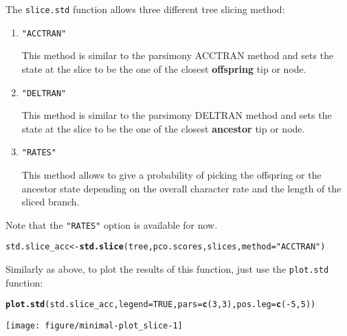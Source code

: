 \documentclass[a4paper,11pt]{article}\usepackage[]{graphicx}\usepackage[]{color}
\makeatletter
\def\maxwidth{ %
  \ifdim\Gin@nat@width>\linewidth
    \linewidth
  \else
    \Gin@nat@width
  \fi
}
\newcommand{\hlnum}[1]{\textcolor[rgb]{0.686,0.059,0.569}{#1}}%
\newcommand{\hlstr}[1]{\textcolor[rgb]{0.192,0.494,0.8}{#1}}%
\newcommand{\hlopt}[1]{\textcolor[rgb]{0,0,0}{#1}}%
\newcommand{\hlstd}[1]{\textcolor[rgb]{0.345,0.345,0.345}{#1}}%
\newcommand{\hlkwb}[1]{\textcolor[rgb]{0.69,0.353,0.396}{#1}}%
\newcommand{\hlkwc}[1]{\textcolor[rgb]{0.333,0.667,0.333}{#1}}%
\newcommand{\hlkwd}[1]{\textcolor[rgb]{0.737,0.353,0.396}{\textbf{#1}}}%
\newenvironment{kframe}{%
 \def\at@end@of@kframe{}%
 \ifinner\ifhmode%
  \def\at@end@of@kframe{\end{minipage}}%
  \begin{minipage}{\columnwidth}%
 \fi\fi%
 \def\FrameCommand##1{\hskip\@totalleftmargin \hskip-\fboxsep
 \colorbox{shadecolor}{##1}\hskip-\fboxsep
     \hskip-\linewidth \hskip-\@totalleftmargin \hskip\columnwidth}%
 \MakeFramed {\advance\hsize-\width
   \@totalleftmargin\z@ \linewidth\hsize
   \@setminipage}}%
 {\par\unskip\endMakeFramed%
 \at@end@of@kframe}
\newenvironment{knitrout}{}{} %
\makeatother
\begin{document}
The \texttt{slice.std} function allows three different tree slicing method:
\begin{enumerate}
\item{\texttt{"ACCTRAN"}}

This method is similar to the parsimony ACCTRAN method and sets the state at the slice to be the one of the closest \textbf{offspring} tip or node.
\item{\texttt{"DELTRAN"}}

This method is similar to the parsimony DELTRAN method and sets the state at the slice to be the one of the closest \textbf{ancestor} tip or node.
\item{\texttt{"RATES"}}

This method allows to give a probability of picking the offspring or the ancestor state depending on the overall character rate and the length of the sliced branch.
\end{enumerate}
Note that the \texttt{"RATES"} option is available for now.

\begin{knitrout}
\color{fgcolor}\begin{kframe}
\begin{alltt}
\hlstd{std.slice_acc}\hlkwb{<-}\hlkwd{std.slice}\hlstd{(tree, pco.scores, slices,} \hlkwc{method}\hlstd{=}\hlstr{"ACCTRAN"}\hlstd{)}
\end{alltt}
\end{kframe}
\end{knitrout}

Similarly as above, to plot the results of this function, just use the \texttt{plot.std} function:

\begin{knitrout}
\color{fgcolor}\begin{kframe}
\begin{alltt}
\hlkwd{plot.std}\hlstd{(std.slice_acc,} \hlkwc{legend}\hlstd{=}\hlnum{TRUE}\hlstd{,} \hlkwc{pars}\hlstd{=}\hlkwd{c}\hlstd{(}\hlnum{3}\hlstd{,}\hlnum{3}\hlstd{),} \hlkwc{pos.leg}\hlstd{=}\hlkwd{c}\hlstd{(}\hlopt{-}\hlnum{5}\hlstd{,}\hlnum{5}\hlstd{))}
\end{alltt}
\end{kframe}

{\centering \texttt{[image: figure/minimal-plot\_slice-1]} 

}



\end{knitrout}
\end{document}
